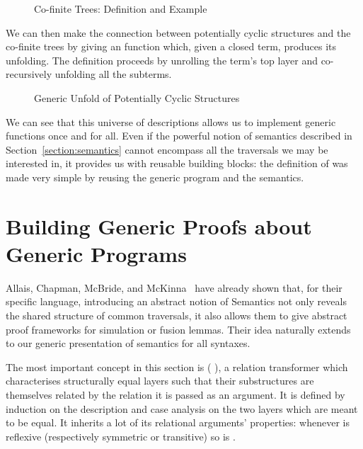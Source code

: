\begin{figure}[h]
\begin{minipage}{0.55\textwidth}
\end{minipage}\hspace{2em}
\begin{minipage}{0.35\textwidth}
\end{minipage}
\caption{Co-finite Trees: Definition and Example}
\end{figure}

We can then make the connection between potentially cyclic
structures and the co-finite trees by giving an 
function which, given a closed term, produces its unfolding.
The definition proceeds by unrolling the term's top layer and
co-recursively unfolding all the subterms.

\begin{figure}[h]
\caption{Generic Unfold of Potentially Cyclic Structures}
\end{figure}

We can see that this universe of descriptions allows us to
implement generic functions once and for all. Even if the
powerful notion of semantics described in Section~\ref{section:semantics}
cannot encompass all the traversals we may be interested in,
it provides us with reusable building blocks: the definition
of  was made very simple by reusing the generic
program  and the  semantics.




\section{Building Generic Proofs about Generic Programs}\label{section:simulation}

Allais, Chapman, McBride, and McKinna~\citeyear{allais2017type} have
already shown that, for their specific language, introducing an abstract
notion of Semantics not only reveals the shared structure of common
traversals, it also allows them to give abstract proof frameworks for
simulation or fusion lemmas. Their idea naturally extends to our generic
presentation of semantics for all syntaxes.

The most important concept in this section is ( ), a relation
transformer which characterises structurally equal layers such that their
substructures are themselves related by the relation it is passed as an
argument. It is defined by induction on the description and case analysis
on the two layers which are meant to be equal. It inherits a lot of its
relational arguments' properties: whenever  is reflexive (respectively
symmetric or transitive) so is   .

